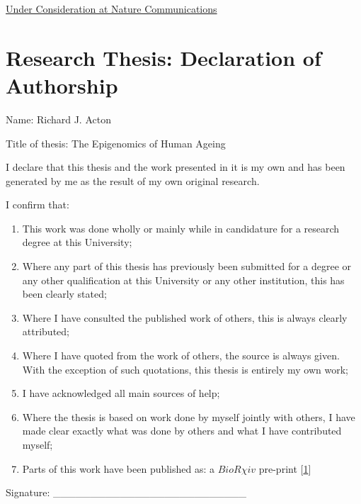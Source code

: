 \documentclass[
]{book}
\providecommand{\tightlist}{%
  \setlength{\itemsep}{0pt}\setlength{\parskip}{0pt}}
\begin{document}
\href{https://nature-research-under-consideration.nature.com/users/37265-nature-communications/posts/57741-the-genomic-loci-of-specific-human-trna-genes-exhibit-ageing-related-dna-hypermethylation}{Under Consideration at Nature Communications}

\newpage

\hypertarget{research-thesis-declaration-of-authorship}{%
\section*{Research Thesis: Declaration of Authorship}\label{research-thesis-declaration-of-authorship}}

Name: Richard J. Acton

Title of thesis: The Epigenomics of Human Ageing

I declare that this thesis and the work presented in it is my own and has been generated by me as the result of my own original research.

I confirm that:

\begin{enumerate}
\def\labelenumi{\arabic{enumi}.}
\tightlist
\item
  This work was done wholly or mainly while in candidature for a research degree at this University;
\item
  Where any part of this thesis has previously been submitted for a degree or any other qualification at this University or any other institution, this has been clearly stated;
\item
  Where I have consulted the published work of others, this is always clearly attributed;
\item
  Where I have quoted from the work of others, the source is always given. With the exception of such quotations, this thesis is entirely my own work;
\item
  I have acknowledged all main sources of help;
\item
  Where the thesis is based on work done by myself jointly with others, I have made clear exactly what was done by others and what I have contributed myself;
\item
  Parts of this work have been published as: a \(BioR \chi iv\) pre-print {[}\protect\hyperlink{ref-Acton2020}{1}{]}
\end{enumerate}

Signature: \_\_\_\_\_\_\_\_\_\_\_\_\_\_\_\_\_\_\_\_\_\_\_\_\_\_
\end{document}
